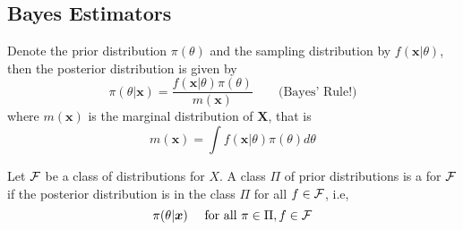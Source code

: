 \subsection{Bayes Estimators}
Denote the prior distribution $\pi(\theta)$ and the sampling distribution by $f(\boldsymbol{x}|\theta)$, then the posterior distribution is given by 
$$
\pi(\theta|\boldsymbol{x}) = \frac{f(\boldsymbol{x}|\theta)\pi(\theta)}{m(\boldsymbol{x})} \quad 
\quad \text{(Bayes' Rule!)}
$$
where $m(\boldsymbol{x})$ is the marginal distribution of $\boldsymbol{X}$, that is 
$$
    m(\boldsymbol{x}) = \int f(\boldsymbol{x}|\theta)\pi(\theta)d\theta
$$

\begin{definition}
    Let $\mathcal F$ be a class of distributions for $X$. A class $\Pi$ of prior distributions is a  for $\mathcal F$ if the posterior distribution is in the class $\Pi$ for all $f \in \mathcal F$, i.e,
    $$
    \pi(\theta|\boldsymbol{x})\quad \text{ for all } \pi \in \Pi, f \in \mathcal F
    $$
\end{definition}